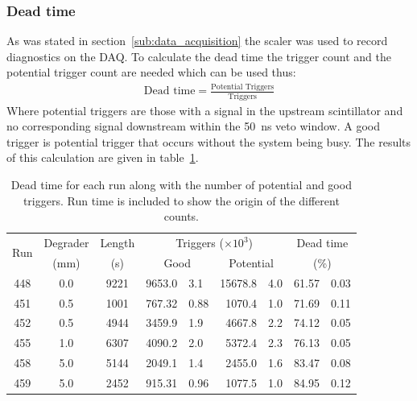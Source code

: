 \subsubsection{Dead time} %
\label{sub:dead_time}
As was stated in section~\ref{sub:data_acquisition} the scaler was used to record diagnostics on the DAQ. To calculate the dead time the trigger count and the potential trigger count are needed which can be used thus:
\begin{align}
    \text{Dead time} = \frac{\text{Potential Triggers}}{\text{Triggers}}
\end{align}
Where potential triggers are those with a signal in the upstream scintillator and no corresponding signal downstream within the 50~ns veto window. A good trigger is potential trigger that occurs without the system being busy. The results of this calculation are given in table~\ref{tab:dead_time}.
\begin{table}
    \begin{center}
    \begin{tabular}{c|c|c|r@{ $\pm$ }l|r@{ $\pm$ }l|r@{ $\pm$ }l }
        \multirow{2}{*}{Run} 
             &  Degrader  &  Length 
                              & \multicolumn{4}{c|}{Triggers (\(\times10^3\))} 
                              & \multicolumn{2}{c}{Dead time} 
                              \\
             & (mm)       & (s)               
                              & \multicolumn{2}{c|}{Good} 
                              & \multicolumn{2}{c|}{Potential} 
                              & \multicolumn{2}{c}{(\%)} 
                              \\    
        \hline
        448  &  0.0  &  9221  &  9653.0 & 3.1   &  15678.8 & 4.0  &  61.57 & 0.03 \\
        451  &  0.5  &  1001  &  767.32 & 0.88  &   1070.4 & 1.0  &  71.69 & 0.11 \\
        452  &  0.5  &  4944  &  3459.9 & 1.9   &   4667.8 & 2.2  &  74.12 & 0.05 \\
        455  &  1.0  &  6307  &  4090.2 & 2.0   &   5372.4 & 2.3  &  76.13 & 0.05 \\
        458  &  5.0  &  5144  &  2049.1 & 1.4   &   2455.0 & 1.6  &  83.47 & 0.08 \\
        459  &  5.0  &  2452  &  915.31 & 0.96  &   1077.5 & 1.0  &  84.95 & 0.12 \\
    \end{tabular}
    \end{center}
    \caption{Dead time for each run along with the number of potential and good triggers. Run time is included to show the origin of the different counts.}
    \label{tab:dead_time}
\end{table}
